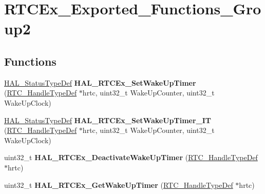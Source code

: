 \hypertarget{group___r_t_c_ex___exported___functions___group2}{}\section{R\+T\+C\+Ex\+\_\+\+Exported\+\_\+\+Functions\+\_\+\+Group2}
\label{group___r_t_c_ex___exported___functions___group2}
\subsection*{Functions}
\begin{DoxyCompactItemize}
\item 
\hyperlink{stm32f4xx__hal__def_8h_a63c0679d1cb8b8c684fbb0632743478f}{H\+A\+L\+\_\+\+Status\+Type\+Def} {\bfseries H\+A\+L\+\_\+\+R\+T\+C\+Ex\+\_\+\+Set\+Wake\+Up\+Timer} (\hyperlink{struct_r_t_c___handle_type_def}{R\+T\+C\+\_\+\+Handle\+Type\+Def} $\ast$hrtc, uint32\+\_\+t Wake\+Up\+Counter, uint32\+\_\+t Wake\+Up\+Clock)\hypertarget{group___r_t_c_ex___exported___functions___group2_gab22373ae0d2eeb1322569c44c42ee9db}{}\label{group___r_t_c_ex___exported___functions___group2_gab22373ae0d2eeb1322569c44c42ee9db}

\item 
\hyperlink{stm32f4xx__hal__def_8h_a63c0679d1cb8b8c684fbb0632743478f}{H\+A\+L\+\_\+\+Status\+Type\+Def} {\bfseries H\+A\+L\+\_\+\+R\+T\+C\+Ex\+\_\+\+Set\+Wake\+Up\+Timer\+\_\+\+IT} (\hyperlink{struct_r_t_c___handle_type_def}{R\+T\+C\+\_\+\+Handle\+Type\+Def} $\ast$hrtc, uint32\+\_\+t Wake\+Up\+Counter, uint32\+\_\+t Wake\+Up\+Clock)\hypertarget{group___r_t_c_ex___exported___functions___group2_ga92f7781781a2fd96991ca932377418da}{}\label{group___r_t_c_ex___exported___functions___group2_ga92f7781781a2fd96991ca932377418da}

\item 
uint32\+\_\+t {\bfseries H\+A\+L\+\_\+\+R\+T\+C\+Ex\+\_\+\+Deactivate\+Wake\+Up\+Timer} (\hyperlink{struct_r_t_c___handle_type_def}{R\+T\+C\+\_\+\+Handle\+Type\+Def} $\ast$hrtc)\hypertarget{group___r_t_c_ex___exported___functions___group2_ga48a0ebb678effede4fca4436e20b18f0}{}\label{group___r_t_c_ex___exported___functions___group2_ga48a0ebb678effede4fca4436e20b18f0}

\item 
uint32\+\_\+t {\bfseries H\+A\+L\+\_\+\+R\+T\+C\+Ex\+\_\+\+Get\+Wake\+Up\+Timer} (\hyperlink{struct_r_t_c___handle_type_def}{R\+T\+C\+\_\+\+Handle\+Type\+Def} $\ast$hrtc)\hypertarget{group___r_t_c_ex___exported___functions___group2_gae2aa87c6544a982c4e7657d649e7a797}{}\label{group___r_t_c_ex___exported___functions___group2_gae2aa87c6544a982c4e7657d649e7a797}


\end{DoxyCompactItemize}
